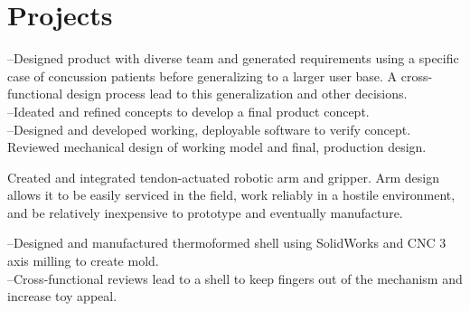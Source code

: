 \documentclass[]{deedy-resume-openfont}
\begin{document}
\begin{minipage}[t]{0.66\textwidth}


\section{Projects}
--Designed product with diverse team and generated requirements using a specific case of concussion patients before generalizing to a larger user base. A cross-functional design process lead to this generalization and other decisions.\\
--Ideated and refined concepts to develop a final product concept. \\
--Designed and developed working, deployable software to verify concept. Reviewed mechanical design of working model and final, production design. 
\sectionsep

Created and integrated tendon-actuated robotic arm and gripper. Arm design allows it to be easily serviced in the field, work reliably in a hostile environment, and be relatively inexpensive to prototype and eventually manufacture. 
\sectionsep

--Designed and manufactured thermoformed shell using SolidWorks and CNC 3 axis milling to create mold. \\
--Cross-functional reviews lead to a shell to keep fingers out of the mechanism and increase toy appeal. %
\sectionsep


\end{minipage}
\end{document}

